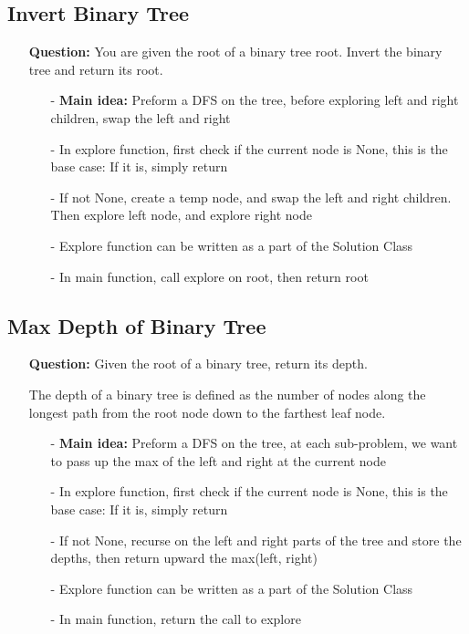 \documentclass[12pt]{article}
\begin{document}
\subsection{Invert Binary Tree}
\begin{enumerate}
  \item[] \textbf{Question:} You are given the root of a binary tree root. Invert the binary tree and return its root. 

    \begin{enumerate}
      \item[-] \textbf{Main idea:} Preform a DFS on the tree, before exploring left and right children, swap the left and right 
      \item[-] In explore function, first check if the current node is None, this is the base case: If it is, simply return 
      \item[-] If not None, create a temp node, and swap the left and right children. Then explore left node, and explore right node
      \item[-] Explore function can be written as a part of the Solution Class
      \item[-] In main function, call explore on root, then return root


    \end{enumerate}
\end{enumerate}


\subsection{Max Depth of Binary Tree}
\begin{enumerate}
  \item[] \textbf{Question:} Given the root of a binary tree, return its depth.

The depth of a binary tree is defined as the number of nodes along the longest path from the root node down to the farthest leaf node.

    \begin{enumerate}
      \item[-] \textbf{Main idea:} Preform a DFS on the tree, at each sub-problem, we want to pass up the max of the left and right at the current node
      \item[-] In explore function, first check if the current node is None, this is the base case: If it is, simply return 
      \item[-] If not None, recurse on the left and right parts of the tree and store the depths, then return upward the max(left, right)
      \item[-] Explore function can be written as a part of the Solution Class
      \item[-] In main function, return the call to explore


    \end{enumerate}
\end{enumerate}
\end{document}

